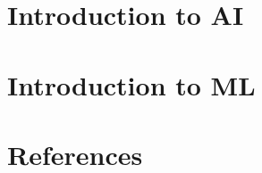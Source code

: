\section[IntroAI]{Introduction to AI}


\section[IntroML]{Introduction to ML}


\section[Refs]{References}


